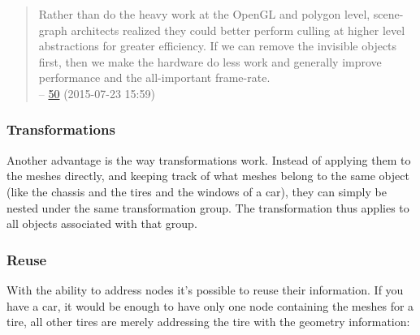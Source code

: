 \begin{quote}
Rather than do the heavy work at the OpenGL and polygon level,
scene-graph architects realized they could better perform culling at
higher level abstractions for greater efficiency. If we can remove the
invisible objects first, then we make the hardware do less work and
generally improve performance and the all-important frame-rate.\\
--
\href{http://www.realityprime.com/blog/2007/06/scenegraphs-past-present-and-future/}{50}
(2015-07-23 15:59)
\end{quote}

\subsubsection{Transformations}\label{transformations}

Another advantage is the way transformations work. Instead of applying
them to the meshes directly, and keeping track of what meshes belong to
the same object (like the chassis and the tires and the windows of a
car), they can simply be nested under the same transformation group. The
transformation thus applies to all objects associated with that group.

\subsubsection{Reuse}\label{reuse}

With the ability to address nodes it's possible to reuse their
information. If you have a car, it would be enough to have only one node
containing the meshes for a tire, all other tires are merely addressing
the tire with the geometry information:


